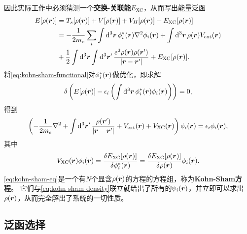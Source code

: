 \documentclass[hyperref, UTF8, a4paper]{ctexart}
\begin{document}
因此实际工作中必须猜测一个\textbf{交换-关联能}$E_\text{XC}$，从而写出能量泛函
\begin{equation}
    \begin{aligned}
        E[\rho(\vb*{r})] &= T_s[\rho(\vb*{r})] + V[\rho(\vb*{r})] + V_H[\rho(\vb*{r})] + E_\text{XC} [\rho(\vb*{r})] \\
        &= - \frac{1}{2m_\text{e}} \sum_i \int \dd[3]{\vb*{r}} \phi_i^*(\vb*{r}) \laplacian \phi_i(\vb*{r})
        + \int \dd[3]{\vb*{r}} \rho(\vb*{r}) V_\text{ext}(\vb*{r}) \\
        &+ \frac{1}{2} \int \dd[3]{\vb*{r}} \int \dd[3]{\vb*{r}'} \frac{e^2 \rho(\vb*{r}) \rho(\vb*{r}')}{\abs{\vb*{r} - \vb*{r}'}} + E_\text{XC} [\rho(\vb*{r})].
    \end{aligned}
    \label{eq:kohn-sham-functional}
\end{equation}
将\eqref{eq:kohn-sham-functional}对$\phi_i^*(\vb*{r})$做优化，即求解
\[
    \var \left( E[\rho(\vb*{r})] - \epsilon_i \left( \int \dd[3]{\vb*{r}} \phi_i^*(\vb*{r}) \phi_i(\vb*{r}) \right) \right) = 0,
\]
得到
\begin{equation}
    \left( - \frac{1}{2 m_\text{e}} \laplacian + \int \dd[3]{\vb*{r}'} \frac{\rho(\vb*{r}')}{\abs{\vb*{r} - \vb*{r}'}} + V_\text{ext}(\vb*{r}) + V_\text{XC}(\vb*{r}) \right) \phi_i(\vb*{r}) = \epsilon_i \phi_i(\vb*{r}),
    \label{eq:kohn-sham-eq}
\end{equation}
其中
\begin{equation}
    V_\text{XC}(\vb*{r}) \phi_i(\vb*{r}) = \fdv{E_\text{XC}[\rho(\vb*{r})]}{\phi^*_i(\vb*{r})} = \fdv{E_\text{XC}[\rho(\vb*{r})]}{\rho(\vb*{r})} \phi_i(\vb*{r}).
\end{equation}
\eqref{eq:kohn-sham-eq}是一个有$N$个显含$\rho(\vb*{r})$的方程的方程组，称为\textbf{Kohn-Sham方程}。
它们与\eqref{eq:kohn-sham-density}联立就给出了所有的$\psi_i(\vb*{r})$，并立即可以求出$\rho(\vb*{r})$，从而完全解出了系统的一切性质。

\subsection{泛函选择}
\end{document}
